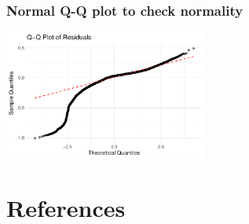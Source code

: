 \documentclass[
  letterpaper,
  DIV=11,
  numbers=noendperiod]{scrartcl}
\begin{document}
\subsubsection{Normal Q-Q plot to check
normality}\label{normal-q-q-plot-to-check-normality}

\includegraphics[width=0.5\textwidth,height=\textheight]{paper_files/figure-pdf/unnamed-chunk-37-1.pdf}

\newpage

\section*{References}\label{references}
\end{document}
